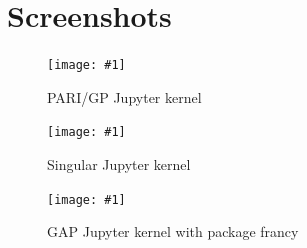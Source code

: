 \documentclass{deliverablereport}
\begin{document}
\appendix
\section{Screenshots}
\newcommand{\screenshot}[2]{
\begin{figure}[ht]
  \texttt{[image: \#1]}
  \caption{#2}
\end{figure}}

\screenshot{pari.png}{PARI/GP Jupyter kernel}
\screenshot{singular.png}{Singular Jupyter kernel}
\clearpage
\screenshot{gap.png}{GAP Jupyter kernel with package francy}
\end{document}
